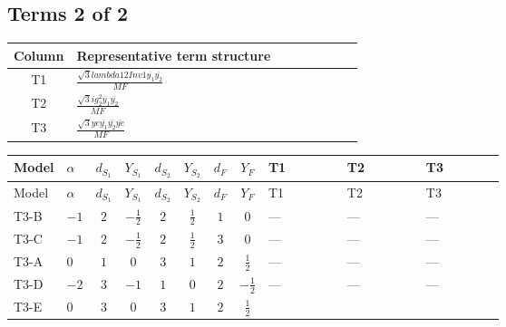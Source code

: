 \documentclass[8pt]{article}
\begin{document}
\begin{landscape}
\subsection*{Terms 2 of 2}
\begin{center}
\begin{tabular}{@{}c >{\raggedright\arraybackslash}p{0.82\linewidth}@{}}
\toprule
Column & Representative term structure \\
\midrule
T1 & \(\displaystyle \frac{\sqrt{3} lambda12Inv1 \overline{y_{1}} \overline{y_{2}}}{MF}\) \\
\midrule
T2 & \(\displaystyle \frac{\sqrt{3} i g_{2}^{2} \overline{y_{1}} \overline{y_{2}}}{MF}\) \\
\midrule
T3 & \(\displaystyle \frac{\sqrt{3} ye \overline{y_{1}} \overline{y_{2}} \overline{ye}}{MF}\) \\
\midrule
\bottomrule
\end{tabular}
\end{center}
\smallskip
\tiny
\begin{longtable}{@{}llcccccc >{\raggedright\arraybackslash}p{0.21\linewidth} >{\raggedright\arraybackslash}p{0.21\linewidth} >{\raggedright\arraybackslash}p{0.21\linewidth}@{}}
\toprule
Model & $\alpha$ & $d_{S_1}$ & $Y_{S_1}$ & $d_{S_2}$ & $Y_{S_2}$ & $d_F$ & $Y_F$ & T1 & T2 & T3 \\
\midrule
\endfirsthead
\toprule
Model & $\alpha$ & $d_{S_1}$ & $Y_{S_1}$ & $d_{S_2}$ & $Y_{S_2}$ & $d_F$ & $Y_F$ & T1 & T2 & T3 \\
\midrule
\endhead
T3-B & $-1$ & $2$ & $-\frac{1}{2}$ & $2$ & $\frac{1}{2}$ & $1$ & $0$ & --- & --- & --- \\
\midrule
T3-C & $-1$ & $2$ & $-\frac{1}{2}$ & $2$ & $\frac{1}{2}$ & $3$ & $0$ & --- & --- & --- \\
\midrule
T3-A & $0$ & $1$ & $0$ & $3$ & $1$ & $2$ & $\frac{1}{2}$ & --- & --- & --- \\
\midrule
T3-D & $-2$ & $3$ & $-1$ & $1$ & $0$ & $2$ & $-\frac{1}{2}$ & --- & --- & --- \\
\midrule
T3-E & $0$ & $3$ & $0$ & $3$ & $1$ & $2$ & $\frac{1}{2}$ & \scriptsize\adjustbox{max width=\linewidth}{$\begin{gathered} \frac{\sqrt{3} lambda12Inv1 \overline{y_{1}} \overline{y_{2}}}{6 MF}\end{gathered}$} & \scriptsize\adjustbox{max width=\linewidth}{$\begin{gathered} - \frac{\sqrt{3} i g_{2}^{2} \overline{y_{1}} \overline{y_{2}}}{6 MF}\end{gathered}$} & \scriptsize\adjustbox{max width=\linewidth}{$\begin{gathered} \frac{\sqrt{3} ye \overline{y_{1}} \overline{y_{2}} \overline{ye}}{12 MF}\end{gathered}$} \\
\midrule
\bottomrule
\end{longtable}
\clearpage

\end{landscape}
\end{document}

